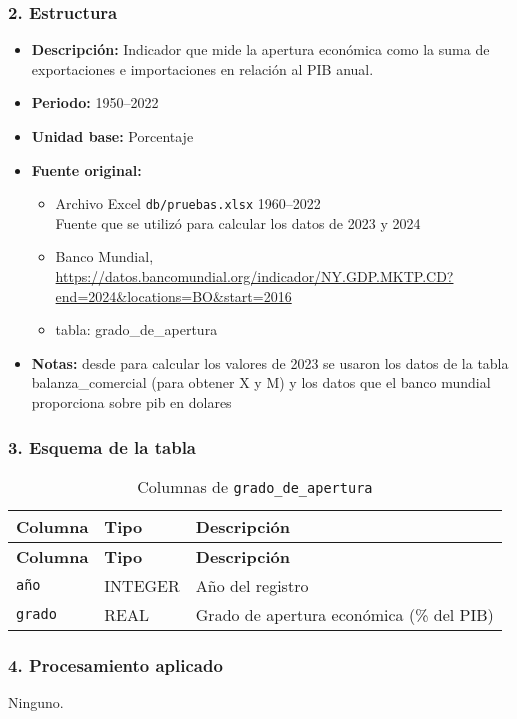 \documentclass[12pt,a4paper]{article}
\begin{document}
\subsubsection*{2. Estructura}
\begin{itemize}
  \item \textbf{Descripción:} Indicador que mide la apertura económica como la suma de exportaciones e importaciones en relación al PIB anual.
  \item \textbf{Periodo:} 1950--2022
  \item \textbf{Unidad base:} Porcentaje
  \item \textbf{Fuente original:} 
    \begin{itemize}
    \item Archivo Excel \texttt{db/pruebas.xlsx} 1960--2022 \\

    Fuente que se utilizó para calcular los datos de 2023 y 2024\\
    \item Banco Mundial, \url{https://datos.bancomundial.org/indicador/NY.GDP.MKTP.CD?end=2024&locations=BO&start=2016}
    \item tabla: grado\_de\_apertura
    \end{itemize}
  \item \textbf{Notas:} desde para calcular los valores de 2023 se usaron los datos de la tabla balanza\_comercial (para obtener X y M) y los datos que el banco mundial proporciona sobre pib en dolares
\end{itemize}

\subsubsection*{3. Esquema de la tabla}
\begin{longtable}{@{}lll@{}}
\caption{Columnas de \texttt{grado\_de\_apertura}}\\
\toprule
\textbf{Columna} & \textbf{Tipo} & \textbf{Descripción} \\
\midrule
\endfirsthead
\toprule
\textbf{Columna} & \textbf{Tipo} & \textbf{Descripción} \\
\midrule
\endhead
\bottomrule
\endfoot
\texttt{año}   & INTEGER & Año del registro \\
\texttt{grado} & REAL    & Grado de apertura económica (\% del PIB) \\
\end{longtable}

\subsubsection*{4. Procesamiento aplicado}
Ninguno.
\end{document}
